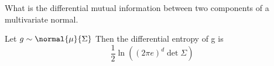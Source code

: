 

What is the differential mutual information
between two components of a multivariate normal.


\begin{prop}
Let $g \sim \normal{\mu}{\Sigma}$
Then the differential entropy of g is
\[
  \frac{1}{2}\ln\left((2\pi e)^d \det\Sigma\right)
\]
\end{prop}
